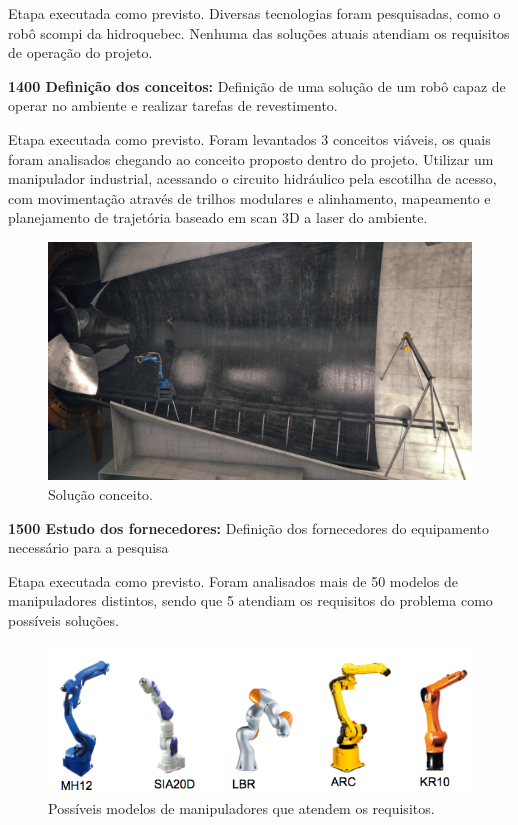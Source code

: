 Etapa executada como previsto. Diversas tecnologias foram pesquisadas, como o
robô scompi da hidroquebec. Nenhuma das soluções atuais atendiam os requisitos
de operação do projeto.

\noindent
\textbf{1400 Definição dos conceitos:} Definição de uma solução de um robô capaz
de operar no ambiente e realizar tarefas de revestimento.

Etapa executada como previsto. Foram levantados 3 conceitos viáveis, os quais
foram analisados chegando ao conceito proposto dentro do projeto. Utilizar um
manipulador industrial, acessando o circuito hidráulico pela escotilha de
acesso, com movimentação através de trilhos modulares e alinhamento, mapeamento
e planejamento de trajetória baseado em scan 3D a laser do ambiente.

\begin{figure}
\centering
\includegraphics[width=0.9\columnwidth]{figs/turbine_evo}
\caption{Solução conceito.}
\end{figure}

\noindent
\textbf{1500 Estudo dos fornecedores:} Definição dos fornecedores do equipamento
necessário para a pesquisa

Etapa executada como previsto. Foram analisados mais de 50 modelos de
manipuladores distintos, sendo que 5 atendiam os requisitos do problema como
possíveis soluções.

\begin{figure}[h!]
\centering
\includegraphics[width=0.9\columnwidth]{figs/robots}
\caption{Possíveis modelos de manipuladores que atendem os requisitos.}
\end{figure}

